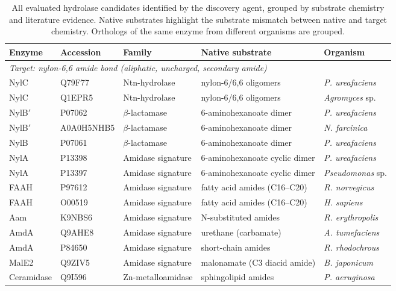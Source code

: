 \documentclass[12pt]{article}
\begin{document}
\begin{table}[H]
\centering
\caption{All evaluated hydrolase candidates identified by the discovery agent, grouped by substrate chemistry and literature evidence. Native substrates highlight the substrate mismatch between native and target chemistry. Orthologs of the same enzyme from different organisms are grouped.}
\label{tab:top_hydrolase}
\begin{adjustbox}{max width=\textwidth}
\small
\begin{tabular}{lllll}
\toprule
\textbf{Enzyme} & \textbf{Accession} & \textbf{Family} & \textbf{Native substrate} & \textbf{Organism} \\
\midrule
\multicolumn{5}{l}{\textit{Target: nylon-6,6 amide bond (aliphatic, uncharged, secondary amide)}} \\
\midrule
NylC & Q79F77 & Ntn-hydrolase & nylon-6/6,6 oligomers & \textit{P. ureafaciens} \\
NylC & Q1EPR5 & Ntn-hydrolase & nylon-6/6,6 oligomers & \textit{Agromyces} sp. \\
NylB$'$ & P07062 & $\beta$-lactamase & 6-aminohexanoate dimer & \textit{P. ureafaciens} \\
NylB$'$ & A0A0H5NHB5 & $\beta$-lactamase & 6-aminohexanoate dimer & \textit{N. farcinica} \\
NylB & P07061 & $\beta$-lactamase & 6-aminohexanoate dimer & \textit{P. ureafaciens} \\
NylA & P13398 & Amidase signature & 6-aminohexanoate cyclic dimer & \textit{P. ureafaciens} \\
NylA & P13397 & Amidase signature & 6-aminohexanoate cyclic dimer & \textit{Pseudomonas} sp. \\
\midrule
FAAH & P97612 & Amidase signature & fatty acid amides (C16--C20) & \textit{R. norvegicus} \\
FAAH & O00519 & Amidase signature & fatty acid amides (C16--C20) & \textit{H. sapiens} \\
Aam & K9NBS6 & Amidase signature & N-substituted amides & \textit{R. erythropolis} \\
AmdA & Q9AHE8 & Amidase signature & urethane (carbamate) & \textit{A. tumefaciens} \\
AmdA & P84650 & Amidase signature & short-chain amides & \textit{R. rhodochrous} \\
MalE2 & Q9ZIV5 & Amidase signature & malonamate (C3 diacid amide) & \textit{B. japonicum} \\
\midrule
Ceramidase & Q9I596 & Zn-metalloamidase & sphingolipid amides & \textit{P. aeruginosa} \\

\end{tabular}
\end{adjustbox}
\end{table}
\end{document}

